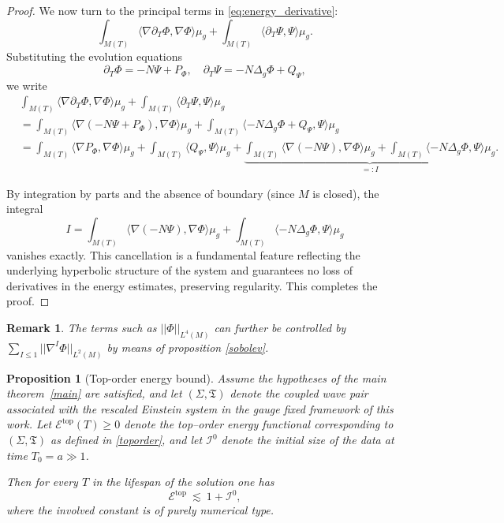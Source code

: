 \documentclass{amsart}
\newtheorem{remark}{Remark}
\newtheorem{proposition}{Proposition}[section]
\begin{document}
\begin{proof}
 \noindent We now turn to the principal terms in \eqref{eq:energy_derivative}:
\[
\int_{M(T)} \langle \nabla \partial_T \Phi, \nabla \Phi \rangle \mu_g + \int_{M(T)} \langle \partial_T \Psi, \Psi \rangle \mu_g.
\]
\noindent Substituting the evolution equations
\[
\partial_T \Phi = - N \Psi + P_{\Phi}, \quad \partial_T \Psi = - N \Delta_g \Phi + Q_{\Psi},
\]
we write
\begin{align*}
&\int_{M(T)} \langle \nabla \partial_T \Phi, \nabla \Phi \rangle \mu_g + \int_{M(T)} \langle \partial_T \Psi, \Psi \rangle \mu_g \\
&= \int_{M(T)} \langle \nabla (- N \Psi + P_{\Phi}), \nabla \Phi \rangle \mu_g + \int_{M(T)} \langle - N \Delta_g \Phi + Q_{\Psi}, \Psi \rangle \mu_g \\
&= \int_{M(T)} \langle \nabla P_{\Phi}, \nabla \Phi \rangle \mu_g + \int_{M(T)} \langle Q_{\Psi}, \Psi \rangle \mu_g + \underbrace{\int_{M(T)} \langle \nabla (- N \Psi), \nabla \Phi \rangle \mu_g + \int_{M(T)} \langle - N \Delta_g \Phi, \Psi \rangle \mu_g}_{=: I}.
\end{align*}

\noindent By integration by parts and the absence of boundary (since $M$ is closed), the integral
\[
I = \int_{M(T)} \langle \nabla (- N \Psi), \nabla \Phi \rangle \mu_g + \int_{M(T)} \langle - N \Delta_g \Phi, \Psi \rangle \mu_g
\]
vanishes exactly. This cancellation is a fundamental feature reflecting the underlying hyperbolic structure of the system and guarantees no loss of derivatives in the energy estimates, preserving regularity. This completes the proof.
\end{proof}
\begin{remark}
The terms such as $||\Phi||_{L^{4}(M)}$ can further be controlled by $\sum_{I\leq 1}||\nabla^{I}\Phi||_{L^{2}(M)}$ by means of proposition 
\ref{sobolev}.
\end{remark}


\begin{proposition}[Top-order energy bound]\label{topestimate}
Assume the hypotheses of the main theorem~\ref{main} are satisfied, and let $(\Sigma,\mathfrak{T})$ denote the coupled wave pair associated with the rescaled Einstein system in the gauge fixed framework of this work.  
Let $\mathscr{E}^{\mathrm{top}}(T)\ge0$ denote the top--order energy functional corresponding to $(\Sigma,\mathfrak{T})$ as defined in \ref{toporder}, and let $\mathcal{I}^{0}$ denote the initial size of the data at time $T_0=a\gg 1$.  

\noindent Then for every $T$ in the lifespan of the solution one has
\[
\mathscr{E}^{\mathrm{top}}\ \lesssim\ 1+\mathcal{I}^{0},
\]
where the involved constant is of purely numerical type.
\end{proposition}
\end{document}
